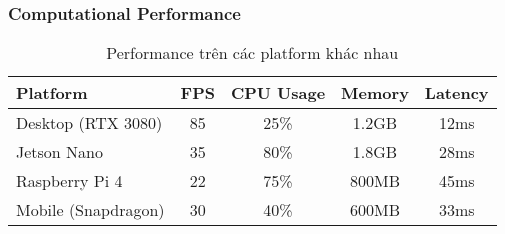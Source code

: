 \subsubsection{Computational Performance}
\begin{table}[htbp]
\centering
\caption{Performance trên các platform khác nhau}
\begin{tabular}{|l|c|c|c|c|}
\hline
\textbf{Platform} & \textbf{FPS} & \textbf{CPU Usage} & \textbf{Memory} & \textbf{Latency} \\
\hline
Desktop (RTX 3080) & 85 & 25\% & 1.2GB & 12ms \\
Jetson Nano & 35 & 80\% & 1.8GB & 28ms \\
Raspberry Pi 4 & 22 & 75\% & 800MB & 45ms \\
Mobile (Snapdragon) & 30 & 40\% & 600MB & 33ms \\
\hline
\end{tabular}
\end{table}

